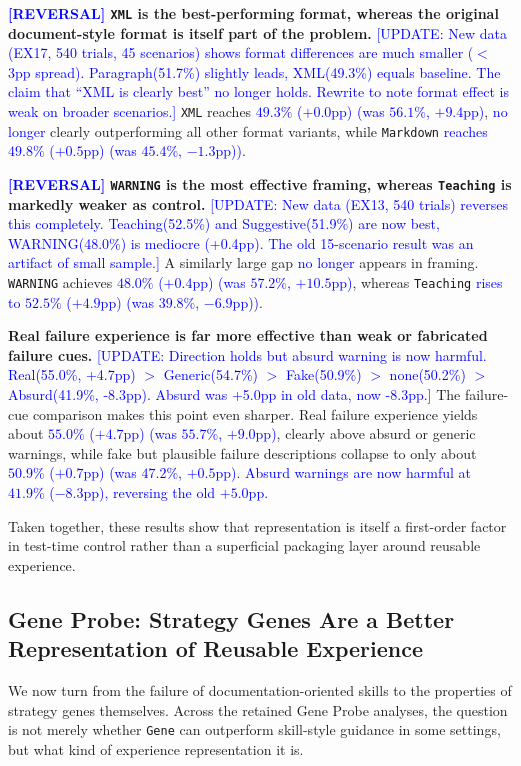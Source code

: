 \documentclass{article}
\newcommand{\blue}[1]{\textcolor{blue}{#1}}
\newcommand{\nbf}[1]{{\noindent \textbf{#1}}}
\begin{document}
\nbf{\blue{[REVERSAL]} \texttt{XML} is the best-performing format, whereas the original document-style format is itself part of the problem.}
\blue{[UPDATE: New data (EX17, 540 trials, 45 scenarios) shows format differences are much smaller ($<$3pp spread). Paragraph(51.7\%) slightly leads, XML(49.3\%) equals baseline. The claim that ``XML is clearly best'' no longer holds. Rewrite to note format effect is weak on broader scenarios.]}
\texttt{XML} reaches \blue{$49.3\%$ ($+0.0$pp) (was $56.1\%$, $+9.4$pp)}, \blue{no longer} clearly outperforming all other format variants, while \texttt{Markdown} \blue{reaches $49.8\%$ ($+0.5$pp) (was $45.4\%$, $-1.3$pp))}.

\nbf{\blue{[REVERSAL]} \texttt{WARNING} is the most effective framing, whereas \texttt{Teaching} is markedly weaker as control.}
\blue{[UPDATE: New data (EX13, 540 trials) reverses this completely. Teaching(52.5\%) and Suggestive(51.9\%) are now best, WARNING(48.0\%) is mediocre (+0.4pp). The old 15-scenario result was an artifact of small sample.]}
A similarly large gap \blue{no longer} appears in framing. \texttt{WARNING} achieves \blue{$48.0\%$ ($+0.4$pp) (was $57.2\%$, $+10.5$pp)}, whereas \texttt{Teaching} \blue{rises to $52.5\%$ ($+4.9$pp) (was $39.8\%$, $-6.9$pp))}.

\nbf{Real failure experience is far more effective than weak or fabricated failure cues.}
\blue{[UPDATE: Direction holds but absurd warning is now harmful. Real(55.0\%, +4.7pp) $>$ Generic(54.7\%) $>$ Fake(50.9\%) $>$ none(50.2\%) $>$ Absurd(41.9\%, -8.3pp). Absurd was +5.0pp in old data, now -8.3pp.]}
The failure-cue comparison makes this point even sharper. Real failure experience yields about \blue{$55.0\%$ ($+4.7$pp) (was $55.7\%$, $+9.0$pp)}, clearly above absurd or generic warnings, while fake but plausible failure descriptions collapse to only about \blue{$50.9\%$ ($+0.7$pp) (was $47.2\%$, $+0.5$pp)}. \blue{Absurd warnings are now harmful at $41.9\%$ ($-8.3$pp), reversing the old $+5.0$pp.}

Taken together, these results show that representation is itself a first-order factor in test-time control rather than a superficial packaging layer around reusable experience.

\subsection{Gene Probe: Strategy Genes Are a Better Representation of Reusable Experience}


We now turn from the failure of documentation-oriented skills to the properties of strategy genes themselves. Across the retained Gene Probe analyses, the question is not merely whether \texttt{Gene} can outperform skill-style guidance in some settings, but what kind of experience representation it is.
\end{document}
